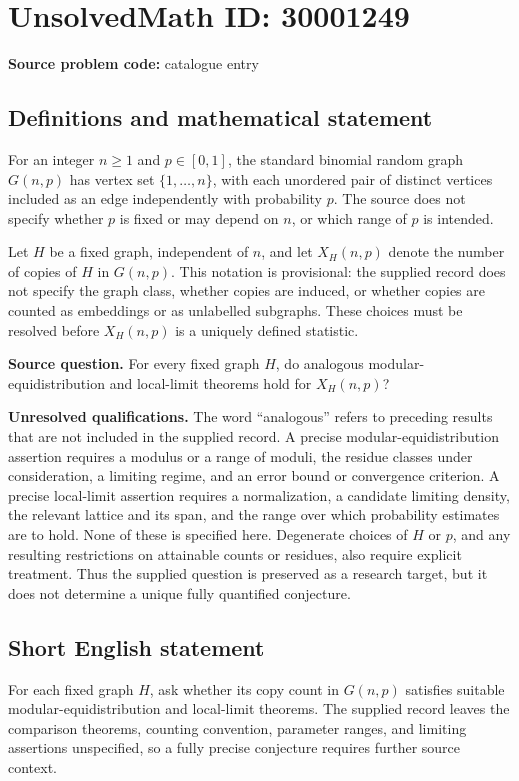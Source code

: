 \documentclass[11pt]{article}
\begin{document}
\section*{UnsolvedMath ID: 30001249}
\textbf{Source problem code:} catalogue entry
\subsection{Definitions and mathematical statement}
For an integer \(n\geq 1\) and \(p\in[0,1]\), the standard binomial random graph \(G(n,p)\) has vertex set \(\{1,\ldots,n\}\), with each unordered pair of distinct vertices included as an edge independently with probability \(p\). The source does not specify whether \(p\) is fixed or may depend on \(n\), or which range of \(p\) is intended.

Let \(H\) be a fixed graph, independent of \(n\), and let \(X_H(n,p)\) denote the number of copies of \(H\) in \(G(n,p)\). This notation is provisional: the supplied record does not specify the graph class, whether copies are induced, or whether copies are counted as embeddings or as unlabelled subgraphs. These choices must be resolved before \(X_H(n,p)\) is a uniquely defined statistic.

\textbf{Source question.} For every fixed graph \(H\), do analogous modular-equidistribution and local-limit theorems hold for \(X_H(n,p)\)?

\textbf{Unresolved qualifications.} The word ``analogous'' refers to preceding results that are not included in the supplied record. A precise modular-equidistribution assertion requires a modulus or a range of moduli, the residue classes under consideration, a limiting regime, and an error bound or convergence criterion. A precise local-limit assertion requires a normalization, a candidate limiting density, the relevant lattice and its span, and the range over which probability estimates are to hold. None of these is specified here. Degenerate choices of \(H\) or \(p\), and any resulting restrictions on attainable counts or residues, also require explicit treatment. Thus the supplied question is preserved as a research target, but it does not determine a unique fully quantified conjecture.
\subsection{Short English statement}
For each fixed graph \(H\), ask whether its copy count in \(G(n,p)\) satisfies suitable modular-equidistribution and local-limit theorems. The supplied record leaves the comparison theorems, counting convention, parameter ranges, and limiting assertions unspecified, so a fully precise conjecture requires further source context.
\end{document}

